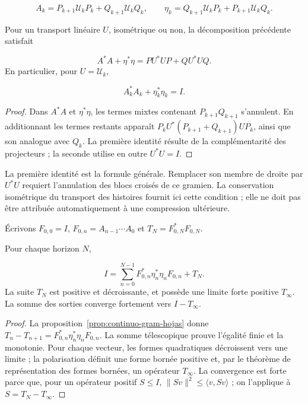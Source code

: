 \[
A_k=P_{k+1}\mathcal U_kP_k+Q_{k+1}\mathcal U_kQ_k,
\qquad
\eta_k=Q_{k+1}\mathcal U_kP_k+P_{k+1}\mathcal U_kQ_k.
\]
\begin{proposition}
\label{prop:continuo-gram-hojas}
Pour un transport linéaire \(U\), isométrique ou non, la décomposition précédente satisfait

\[
A^*A+\eta^*\eta=PU^*UP+QU^*UQ.
\]
En particulier, pour \(U=\mathcal U_k\),

\[
A_k^*A_k+\eta_k^*\eta_k=I.
\]
\end{proposition}
\begin{proof}
Dans \(A^*A\) et \(\eta^*\eta\), les termes mixtes contenant \(P_{k+1}Q_{k+1}\) s'annulent. En additionnant les termes restants apparaît \(P_kU^*(P_{k+1}+Q_{k+1})UP_k\), ainsi que son analogue avec \(Q_k\). La première identité résulte de la complémentarité des projecteurs ; la seconde utilise en outre \(U^*U=I\).
\end{proof}

La première identité est la formule générale. Remplacer son membre de droite par \(U^*U\) requiert l'annulation des blocs croisés de ce gramien. La conservation isométrique du transport des histoires fournit ici cette condition ; elle ne doit pas être attribuée automatiquement à une compression ultérieure.

Écrivons \(F_{0,0}=I\), \(F_{0,n}=A_{n-1}\cdots A_0\) et \(T_N=F_{0,N}^*F_{0,N}\).

\begin{theorem}
\label{thm:continuo-descomposicion-terminal}
Pour chaque horizon \(N\),

\[
I=\sum_{n=0}^{N-1}
F_{0,n}^*\eta_n^*\eta_nF_{0,n}+T_N.
\]
La suite \(T_N\) est positive et décroissante, et possède une limite forte positive \(T_\infty\). La somme des sorties converge fortement vers \(I-T_\infty\).
\end{theorem}
\begin{proof}
La proposition~\ref{prop:continuo-gram-hojas} donne \(T_n-T_{n+1}=F_{0,n}^*\eta_n^*\eta_nF_{0,n}\). La somme télescopique prouve l'égalité finie et la monotonie. Pour chaque vecteur, les formes quadratiques décroissent vers une limite ; la polarisation définit une forme bornée positive et, par le théorème de représentation des formes bornées, un opérateur \(T_\infty\). La convergence est forte parce que, pour un opérateur positif \(S\leq I\), \(\|Sv\|^2\leq\langle v,Sv\rangle\) ; on l'applique à \(S=T_N-T_\infty\).
\end{proof}

